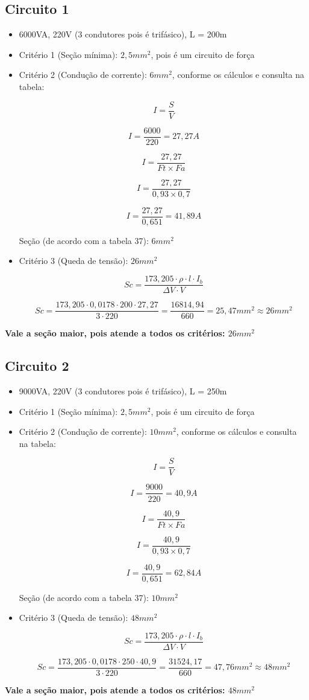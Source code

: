 \documentclass{article}
\begin{document}
\subsection{Circuito 1}
\begin{itemize}
\item 6000VA, 220V (3 condutores pois é trifásico), L = 200m
\item Critério 1 (Seção mínima): $2,5mm^2$, pois é um circuito de força
\item Critério 2 (Condução de corrente): $6mm^2$, conforme os cálculos e consulta na tabela:

\[I = \frac{S}{V}\]

\[I = \frac{6000}{220} = 27,27 A\]

\[I = \frac{27,27}{Ft\times Fa}\]

\[I = \frac{27,27}{0,93\times 0,7}\]

\[I = \frac{27,27}{0,651} = 41,89A\]

Seção (de acordo com a tabela 37): $6mm^2$

\item Critério 3 (Queda de tensão): $26mm^2$

\[Sc = \frac{173,205\cdot \rho\cdot l\cdot I_{b}}{\Delta V\cdot V}\]

\[Sc = \frac{173,205\cdot 0,0178\cdot 200\cdot 27,27}{3\cdot 220} = \frac{16814,94}{660} = 25,47mm^2 \approx 26mm^2\]
\end{itemize}

\textbf{Vale a seção maior, pois atende a todos os critérios: $26mm^2$}

\subsection{Circuito 2}
\begin{itemize}
\item 9000VA, 220V (3 condutores pois é trifásico), L = 250m
\item Critério 1 (Seção mínima): $2,5mm^2$, pois é um circuito de força
\item Critério 2 (Condução de corrente): $10mm^2$, conforme os cálculos e consulta na tabela:

\[I = \frac{S}{V}\]

\[I = \frac{9000}{220} = 40,9 A\]

\[I = \frac{40,9}{Ft\times Fa}\]

\[I = \frac{40,9}{0,93\times 0,7}\]

\[I = \frac{40,9}{0,651} = 62,84 A\]

Seção (de acordo com a tabela 37): $10mm^2$

\item Critério 3 (Queda de tensão): $48mm^2$

\[Sc = \frac{173,205\cdot \rho\cdot l\cdot I_{b}}{\Delta V\cdot V}\]

\[Sc = \frac{173,205\cdot 0,0178\cdot 250\cdot 40,9}{3\cdot 220} = \frac{31524,17}{660} = 47,76mm^2 \approx 48mm^2\]
\end{itemize}

\textbf{Vale a seção maior, pois atende a todos os critérios: $48mm^2$}
\end{document}
